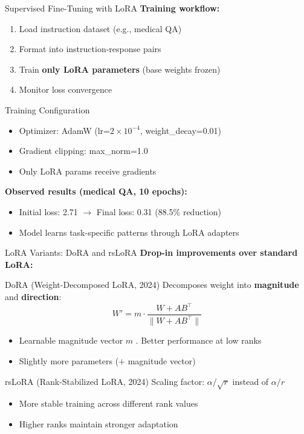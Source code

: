 \documentclass[aspectratio=169,10pt]{beamer}
\begin{document}
\begin{frame}{Supervised Fine-Tuning with LoRA}
	\textbf{Training workflow:}
	\begin{enumerate}
		\item Load instruction dataset (e.g., medical QA)
		\item Format into instruction-response pairs
		\item Train \textbf{only LoRA parameters} (base weights frozen)
		\item Monitor loss convergence
	\end{enumerate}

	\vspace{0.3cm}
	\begin{block}{Training Configuration}
		\begin{itemize}
			\item Optimizer: AdamW (lr=$2 \times 10^{-4}$, weight\_decay=0.01)
			\item Gradient clipping: max\_norm=1.0
			\item Only LoRA params receive gradients
		\end{itemize}
	\end{block}

	\vspace{0.2cm}
	\textbf{Observed results (medical QA, 10 epochs):}
	\begin{itemize}
		\item Initial loss: 2.71 $\to$ Final loss: 0.31 (88.5\% reduction)
		\item Model learns task-specific patterns through LoRA adapters
	\end{itemize}
\end{frame}



\begin{frame}{LoRA Variants: DoRA and rsLoRA}
	\textbf{Drop-in improvements over standard LoRA:}


	\begin{block}{DoRA (Weight-Decomposed LoRA, 2024)}
		Decomposes weight into \textbf{magnitude} and \textbf{direction}:
		$$W' = m \cdot \frac{W + AB^\top}{\|W + AB^\top\|}$$
		\begin{itemize}
			\item Learnable magnitude vector $m$ . Better performance at low ranks
			\item Slightly more parameters ($+$ magnitude vector)
		\end{itemize}
	\end{block}


	\begin{block}{rsLoRA (Rank-Stabilized LoRA, 2024)}
		Scaling factor: $\alpha / \sqrt{r}$ instead of $\alpha / r$
		\begin{itemize}
			\item More stable training across different rank values
			\item Higher ranks maintain stronger adaptation
		\end{itemize}
	\end{block}
\end{frame}
\end{document}
